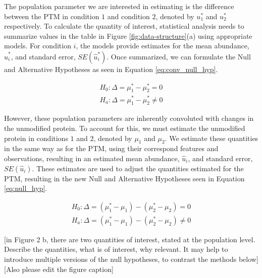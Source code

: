 \documentclass[mcp]{article}
\numberwithin{table}{section}
\def\todo#1{{\color{red}[#1]}}
\begin{document}
The population parameter we are interested in estimating is the difference between the PTM in condition $1$ and condition $2$, denoted by $u_1^{\ast}$ and $u_2^{\ast}$ respectively. To calculate the quantity of interest, statistical analysis needs to summarize values in the table in Figure \ref{fig:data-structure}(a) using appropriate models. For condition $i$, the models provide estimates for the mean abundance, $\hat{u}_i^{\ast}$, and standard error, $SE(\hat{u}_i^{\ast})$. Once summarized, we can formulate the Null and Alternative Hypotheses as seen in Equation \ref{eq:conv_null_hyp}. 

\begin{equation}
\begin{aligned}
H_{0}: \Delta = \mu_{1}^{\ast} - \mu_{2}^{\ast} = 0 \\
H_{a}: \Delta = \mu_{1}^{\ast} - \mu_{2}^{\ast} \neq 0
\end{aligned}
\label{eq:conv_null_hyp}
\end{equation}

However, these population parameters are inherently convoluted with changes in the unmodified protein. To account for this, we must estimate the unmodified protein in conditions $1$ and $2$, denoted by $\mu_1$ and $\mu_2$. We estimate these quantities in the same way as for the PTM, using their correspond features and observations, resulting in an estimated mean abundance, $\hat{u}_i$, and standard error, $SE(\hat{u}_i)$. These estimates are used to adjust the quantities estimated for the PTM, resulting in the new Null and Alternative Hypotheses seen in Equation \ref{eq:null_hyp}.

\begin{equation}
\begin{aligned}
H_{0}: \Delta = ( \mu_{1}^{\ast} - \mu_{1}) - ( \mu_{2}^{\ast} - \mu_{2} ) = 0 \\
H_{a}: \Delta = ( \mu_{1}^{\ast} - \mu_{1}) - ( \mu_{2}^{\ast} - \mu_{2} ) \neq 0
\end{aligned}
\label{eq:null_hyp}
\end{equation}

\todo{in Figure 2 b, there are two quantities of interest, stated at the population level. Describe the quantities, what is of interest, why relevant. It may help to introduce multiple versions of the null hypotheses, to contrast the methods below} \todo{Also please edit the figure caption}

\end{document}
